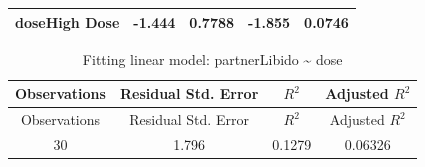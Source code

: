 \documentclass[]{article}
\begin{document}
\begin{longtable}[]{@{}ccccc@{}}
\begin{minipage}[t]{0.24\columnwidth}\centering\strut
\textbf{doseHigh Dose}\strut
\end{minipage} & \begin{minipage}[t]{0.13\columnwidth}\centering\strut
-1.444\strut
\end{minipage} & \begin{minipage}[t]{0.16\columnwidth}\centering\strut
0.7788\strut
\end{minipage} & \begin{minipage}[t]{0.12\columnwidth}\centering\strut
-1.855\strut
\end{minipage} & \begin{minipage}[t]{0.13\columnwidth}\centering\strut
0.0746\strut
\end{minipage}\tabularnewline
\bottomrule
\end{longtable}

\begin{longtable}[]{@{}cccc@{}}
\caption{Fitting linear model: partnerLibido \textasciitilde{}
dose}\tabularnewline
\toprule
\begin{minipage}[b]{0.18\columnwidth}\centering\strut
Observations\strut
\end{minipage} & \begin{minipage}[b]{0.27\columnwidth}\centering\strut
Residual Std. Error\strut
\end{minipage} & \begin{minipage}[b]{0.11\columnwidth}\centering\strut
\(R^2\)\strut
\end{minipage} & \begin{minipage}[b]{0.20\columnwidth}\centering\strut
Adjusted \(R^2\)\strut
\end{minipage}\tabularnewline
\midrule
\endfirsthead
\toprule
\begin{minipage}[b]{0.18\columnwidth}\centering\strut
Observations\strut
\end{minipage} & \begin{minipage}[b]{0.27\columnwidth}\centering\strut
Residual Std. Error\strut
\end{minipage} & \begin{minipage}[b]{0.11\columnwidth}\centering\strut
\(R^2\)\strut
\end{minipage} & \begin{minipage}[b]{0.20\columnwidth}\centering\strut
Adjusted \(R^2\)\strut
\end{minipage}\tabularnewline
\midrule
\endhead
\begin{minipage}[t]{0.18\columnwidth}\centering\strut
30\strut
\end{minipage} & \begin{minipage}[t]{0.27\columnwidth}\centering\strut
1.796\strut
\end{minipage} & \begin{minipage}[t]{0.11\columnwidth}\centering\strut
0.1279\strut
\end{minipage} & \begin{minipage}[t]{0.20\columnwidth}\centering\strut
0.06326\strut
\end{minipage}\tabularnewline
\bottomrule
\end{longtable}
\end{document}
